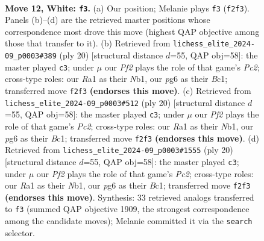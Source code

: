 \documentclass[11pt]{article}
\begin{document}
\clearpage

\begin{figure}[p]\centering
\begin{subfigure}{0.46\textwidth}\centering
\resizebox{\linewidth}{!}{%
\newchessgame
\chessboard[
  setfen={r1bqr1k1/pppp1p1p/3n1bp1/8/8/1PN5/P1PP1PPP/R1BQRBK1 w - - 1 12},
  showmover=false,
  pgfstyle=straightmove, color=movearrow, markmove={f2-f3}
]}
\caption{}
\end{subfigure}\hfill
\begin{subfigure}{0.46\textwidth}\centering
\resizebox{\linewidth}{!}{%
\newchessgame
\chessboard[
  setfen={r1bqr1k1/pppp1ppp/3n1b2/8/3P4/8/PPP2PPP/RNBQRBK1 w - - 3 11},
  showmover=false,
  pgfstyle=straightmove, color=movearrow, markmove={c2-c3}
]}
\caption{}
\end{subfigure}
\\[4pt]
\begin{subfigure}{0.46\textwidth}\centering
\resizebox{\linewidth}{!}{%
\newchessgame
\chessboard[
  setfen={r1bqr1k1/pppp1ppp/3n1b2/8/3P4/8/PPP2PPP/RNBQRBK1 w - - 3 11},
  showmover=false,
  pgfstyle=straightmove, color=movearrow, markmove={c2-c3}
]}
\caption{}
\end{subfigure}\hfill
\begin{subfigure}{0.46\textwidth}\centering
\resizebox{\linewidth}{!}{%
\newchessgame
\chessboard[
  setfen={r1bqr1k1/pppp1ppp/3n1b2/8/3P4/8/PPP2PPP/RNBQRBK1 w - - 3 11},
  showmover=false,
  pgfstyle=straightmove, color=movearrow, markmove={c2-c3}
]}
\caption{}
\end{subfigure}
\caption{\textbf{Move 12, White: \texttt{f3}.} (a) Our position; Melanie plays \texttt{f3} (\texttt{f2f3}). Panels (b)--(d) are the retrieved master positions whose correspondence most drove this move (highest QAP objective among those that transfer to it). (b) Retrieved from \texttt{lichess\_elite\_2024-09\_p0003\#389} (ply 20) [structural distance $d$=55, QAP obj=58]: the master played \texttt{c3}; under $\mu$ our \emph{Pf2} plays the role of that game's \emph{Pc2}; cross-type roles: our \emph{R}a1 as their \emph{N}b1, our \emph{p}g6 as their \emph{B}c1; transferred move \texttt{f2f3} \textbf{(endorses this move)}. (c) Retrieved from \texttt{lichess\_elite\_2024-09\_p0003\#512} (ply 20) [structural distance $d$=55, QAP obj=58]: the master played \texttt{c3}; under $\mu$ our \emph{Pf2} plays the role of that game's \emph{Pc2}; cross-type roles: our \emph{R}a1 as their \emph{N}b1, our \emph{p}g6 as their \emph{B}c1; transferred move \texttt{f2f3} \textbf{(endorses this move)}. (d) Retrieved from \texttt{lichess\_elite\_2024-09\_p0003\#1555} (ply 20) [structural distance $d$=55, QAP obj=58]: the master played \texttt{c3}; under $\mu$ our \emph{Pf2} plays the role of that game's \emph{Pc2}; cross-type roles: our \emph{R}a1 as their \emph{N}b1, our \emph{p}g6 as their \emph{B}c1; transferred move \texttt{f2f3} \textbf{(endorses this move)}. Synthesis: 33 retrieved analogs transferred to \texttt{f3} (summed QAP objective 1909, the strongest correspondence among the candidate moves); Melanie committed it via the \texttt{search} selector.}
\label{fig:thought-m22}
\end{figure}
\end{document}
